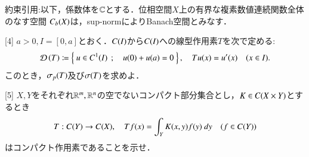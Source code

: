 約束引用:以下，係数体を$\mathbb{C}$とする．位相空間$X$上の有界な複素数値連続関数全体のなす空間
$C_b (X)$は，sup-normによりBanach空間とみなす．

	\begin{itembox}[l]{[4]}
		$a > 0,I = [0,a]$とおく．$C(I)$から$C(I)$への線型作用素$T$を次で定める:
			\begin{align}
				\Dom{T} \coloneqq \Set{u \in \cn{I}{1}}{u(0) + u(a) = 0},
				\quad Tu(x) = u'(x) \quad (x \in I).
			\end{align}
			このとき，$\mathfrak{\sigma}_p (T) $及び$\mathfrak{\sigma} (T) $を求めよ．
	\end{itembox}
	
	
	
\newpage
	\begin{itembox}[l]{[5]}
		$X,Y$をそれぞれ$\mathbb{R}^m,\mathbb{R}^n$の空でないコンパクト部分集合とし，$K \in C(X \times Y)$とするとき
		\begin{align}
			T:C(Y) \rightarrow C(X),
			\quad T f(x) = \int_Y K(x,y) f(y)\ dy \quad (f \in C(Y))
		\end{align}
		はコンパクト作用素であることを示せ．
	\end{itembox}
	
